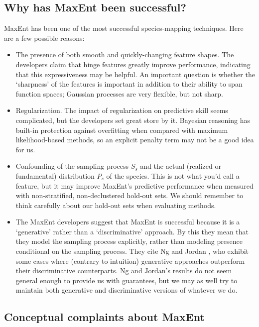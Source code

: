 \subsection{Why has MaxEnt been successful?}
\label{sec:maxent-success} 
MaxEnt has been one of the most successful species-mapping techniques. Here are a few possible reasons:
\begin{itemize}
    \item The presence of both smooth and quickly-changing feature shapes. The developers claim that hinge features greatly improve performance, indicating that this expressiveness may be helpful. An important question is whether the `sharpness' of the features is important in addition to their ability to span function spaces; Gaussian processes are very flexible, but not sharp.
    \item Regularization. The impact of regularization on predictive skill seems complicated, but the developers set great store by it. Bayesian reasoning has built-in protection against overfitting when compared with maximum likelihood-based methods, so an explicit penalty term may not be a good idea for us.
    \item Confounding of the sampling process $S_s$ and the actual (realized or fundamental) distribution $P_s$ of the species. This is not what you'd call a feature, but it may improve MaxEnt's predictive performance when measured with non-stratified, non-declustered hold-out sets. We should remember to think carefully about our hold-out sets when evaluating methods.
    \item The MaxEnt developers suggest that MaxEnt is successful because it is a `generative' rather than a `discriminative' approach. By this they mean that they model the sampling process explicitly, rather than modeling presence conditional on the sampling process. They cite Ng and Jordan \cite{Ng:2009p12220}, who exhibit some cases where (contrary to intuition) generative approaches outperform their discriminative counterparts. Ng and Jordan's results do not seem general enough to provide us with guarantees, but we may as well try to maintain both generative and discriminative versions of whatever we do.
\end{itemize}


\subsection{Conceptual complaints about MaxEnt}

\label{sec:weaknesses}

